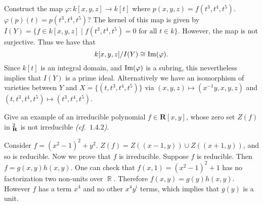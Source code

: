 \documentclass{/Users/SHER/Documents/Hartshorne-Exercises/hw_pset} %
\DeclareMathOperator{\im}{\rm{Im}}    %
\let\aa\relax
\DeclareMathOperator{\aa}{\mathbf{A}} %
\DeclareMathOperator{\R}{\mathbb{R}}
\renewcommand{\phi}{\varphi}
\newcommand{\lfy}[1]{{\color{Maroon} #1}}
\begin{document}
\begin{solution}
    Construct the map $\phi: k[x,y,z] \to k[t]$ where $p(x,y,z) = f(t^3, t^4, t^5)$. \lfy{$\phi(p)(t) = p(t^3, t^4, t^5)$?}
    The kernel of this map is given by $I(Y) = \{f \in k[x,y,z] \mid f(t^3, t^4, t^5) = 0 \text{ for all } t \in k  \}$.
    However, the map is not surjective. 
    Thus we have that 
    \[
        k[x,y,z]/I(Y) \cong \im(\phi).
    \]
    Since $k[t]$ is an integral domain, and $\im(\phi)$ is a subring, 
    this nevertheless implies that $I(Y)$ is a prime ideal.
    \lfy{Alternatively we have an isomorphism of varieties between $Y$ and $X = \{(t, t^3, t^4, t^5)\}$ via $(x, y, z) \mapsto (x^{-1}y, x, y, z)$ and $(t, t^3, t^4, t^5) \mapsto (t^3, t^4, t^5)$.}
\end{solution}

\begin{exercise}[1.12]
    Give an example of an irreducible polynomial $f \in \mathbf{R}[x,y]$,
    whose zero set $Z(f)$ in $\aa_{\mathbf{R}}^2$ is not irreducible
    \emph{(cf.~$1.4.2$)}.
\end{exercise}

\begin{solution}
\lfy{Consider $f = (x^2-1)^2+y^2$. $Z(f) = Z((x-1, y)) \cup Z((x+1, y))$, and so is reducible. Now we prove that $f$ is irreducible. Suppose $f$ is reducible. Then $f = g(x,y)h(x,y)$. One can check that $f(x,1) = (x^2-1)^2+1$ has no factorization two non-units over $\R$. Therefore $f(x,y) = g(y)h(x,y).$ However $f$ has a term $x^4$ and no other $x^4y^i$ terms, which implies that $g(y)$ is a unit.}
\end{solution}
\end{document}
